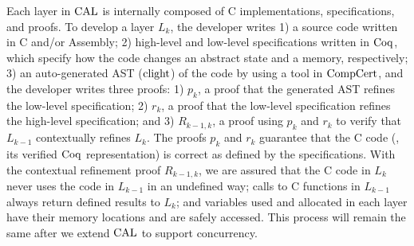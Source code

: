 Each layer in $\mathrm{CAL}$ is internally composed of  C implementations, specifications, and proofs.
To develop a layer $L_k$, 
the developer writes 
1) a source code written in C and/or Assembly; 
2) high-level and  low-level specifications written in $\mathrm{Coq}$, which specify how the code changes an abstract state and  a memory, respectively; 
3) an auto-generated AST ($\mathrm{clight}$) of the code by using a tool in $\mathrm{CompCert}$,
and the developer writes three proofs: 
1) $p_k$, a proof that the generated AST refines the low-level specification; 
2) $r_k$, a proof that the low-level specification refines the high-level specification; and 
3) $R_{k-1,k}$, a proof using $p_k$ and $r_k$ to verify that $L_{k-1}$ contextually refines $L_{k}$. 
The proofs $p_k$ and $r_k$ guarantee that the C code (\ie , its verified $\mathrm{Coq}$ representation) is correct as defined by the specifications.
 With the contextual refinement proof $R_{k-1, k}$, we are assured that the C code in $L_k$ never uses the code in $L_{k-1}$ in an undefined way; 
 calls to C functions in $L_{k-1}$ always return defined results to $L_k$; and variables 
 used and allocated in each layer have their memory locations and are safely accessed.
 This process will remain the same after we extend $\mathrm{CAL}$ to support concurrency.